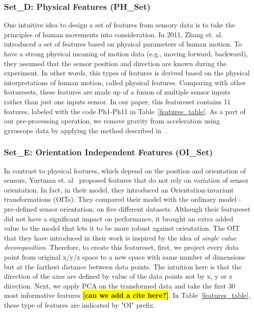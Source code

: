 \documentclass[journal,article,submit,moreauthors,pdftex]{Definitions/mdpi}
\newcommand{\todo}[1]{\colorbox{yellow}{\textbf{[#1]}}}
\begin{document}
\subsubsection{Set\_D: Physical Features (PH\_Set)}
One intuitive idea to design a set of features from sensory data is to take the principles of human movements into consideration. In 2011, Zhang et. al. ~\cite{zhang2011feature} introduced a set of features based on physical parameters of human motion. To have a strong physical meaning of motion data (e.g., moving forward, backward), they assumed that the sensor position and direction are known during the experiment. In other words, this types of features is derived based on the physical interpretations of human motion, called physical features. Comparing with other featuresets, these features are made up of a fusion of multiple sensor inputs rather than just one inputs sensor. In our paper, this featureset contains 11 features, labeled with the code Ph1-Ph11 in Table~\ref{features_table}. As a part of our pre-processing operation, we remove gravity from acceleration using gyroscope data by applying the method described in~\cite{Accelero5:online}.

\subsubsection{Set\_E: Orientation Independent Features (OI\_Set)}
In contrast to physical features, which depend on the position and orientation of sensors, Yurtman et. al~\cite{yurtman2017activity} proposed features that do not rely on variation of sensor orientation. In fact, in their model, they introduced an Orientation-invariant transformations (OITs). They compared their model with the ordinary model - pre-defined sensor orientation, on five different datasets. Although their featureset did not have a significant impact on performance, it brought an extra added value to the model that lets it to be more robust against orientation. The OIT that they have introduced in their work is inspired by the idea of \textit{single value decomposition}\cite{moon2000mathematical}. Therefore, to create this featureset, first, we project every data point from original x/y/z space to a new space with same number of dimensions but at the farthest distance between data points. The intuition here is that the direction of the axes are defined by value of the data points not by x, y or z direction. Next, we apply PCA on the transformed data and take the first 30 most informative features \cite{janidarmian2017comprehensive} \todo{can we add a cite here?}. In Table~\ref{features_table}, these type of features  are indicated by "OI" prefix.
\end{document}
